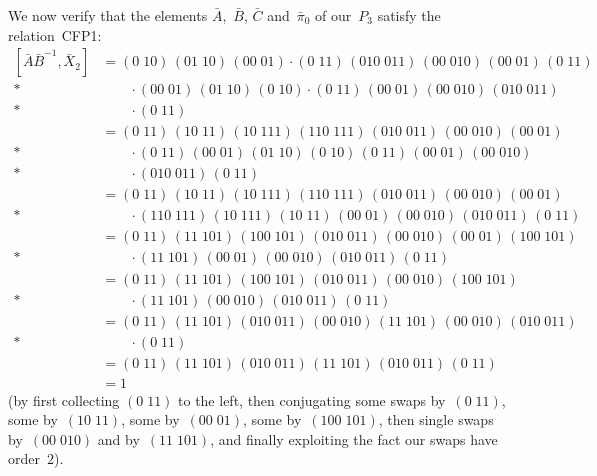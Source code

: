\documentclass[a4paper,11pt]{article}
\numberwithin{equation}{section}
\newcommand{\swap}[2]{(#1\;#2)}
\begin{document}
We now verify that the elements $\bar{A}$,~$\bar{B}$, $\bar{C}$
and~$\bar{\pi}_{0}$ of our~$P_{3}$ satisfy the relation~CFP1:
\begin{align*}
  [ \bar{A}\bar{B}^{-1} , \bar{X}_{2} ]
  &= \swap{0}{10} \, \swap{01}{10} \, \swap{00}{01} \cdot \swap{0}{11}
  \, \swap{010}{011} \, \swap{00}{010} \, \swap{00}{01} \,
  \swap{0}{11} \\*
  &\qquad \cdot \swap{00}{01} \, \swap{01}{10} \, \swap{0}{10} \cdot
  \swap{0}{11} \, \swap{00}{01} \, \swap{00}{010} \, \swap{010}{011}
  \\*
  &\qquad \cdot \swap{0}{11} \\
  &= \swap{0}{11} \, \swap{10}{11} \, \swap{10}{111} \,
  \swap{110}{111} \, \swap{010}{011} \, \swap{00}{010} \,
  \swap{00}{01} \\*
  &\qquad \cdot \swap{0}{11} \, \swap{00}{01} \, \swap{01}{10} \,
  \swap{0}{10} \, \swap{0}{11} \, \swap{00}{01} \, \swap{00}{010} \\*
  &\qquad \cdot \swap{010}{011} \, \swap{0}{11} \\
  &= \swap{0}{11} \, \swap{10}{11} \, \swap{10}{111} \,
  \swap{110}{111} \, \swap{010}{011} \, \swap{00}{010} \,
  \swap{00}{01} \\*
  &\qquad \cdot \swap{110}{111} \, \swap{10}{111} \, \swap{10}{11} \,
  \swap{00}{01} \, \swap{00}{010} \, \swap{010}{011} \, \swap{0}{11}
  \\
  &= \swap{0}{11} \, \swap{11}{101} \, \swap{100}{101} \,
  \swap{010}{011} \, \swap{00}{010} \, \swap{00}{01} \,
  \swap{100}{101} \\*
  &\qquad \cdot \swap{11}{101} \, \swap{00}{01} \, \swap{00}{010} \,
  \swap{010}{011} \, \swap{0}{11} \\
  &= \swap{0}{11} \, \swap{11}{101} \, \swap{100}{101} \,
  \swap{010}{011} \, \swap{00}{010} \, \swap{100}{101} \\*
  &\qquad \cdot \swap{11}{101} \, \swap{00}{010} \, \swap{010}{011} \,
  \swap{0}{11} \\
  &= \swap{0}{11} \, \swap{11}{101} \, \swap{010}{011} \,
  \swap{00}{010} \, \swap{11}{101} \, \swap{00}{010} \,
  \swap{010}{011} \\*
  &\qquad \cdot \swap{0}{11} \\
  &= \swap{0}{11} \, \swap{11}{101} \, \swap{010}{011} \,
  \swap{11}{101} \, \swap{010}{011} \, \swap{0}{11} \\
  &= 1
\end{align*}
(by first collecting $\swap{0}{11}$ to the left, then conjugating some
swaps by~$\swap{0}{11}$, some by~$\swap{10}{11}$, some
by~$\swap{00}{01}$, some by~$\swap{100}{101}$, then single swaps
by~$\swap{00}{010}$ and by~$\swap{11}{101}$, and finally exploiting
the fact our swaps have order~$2$).
\end{document}
